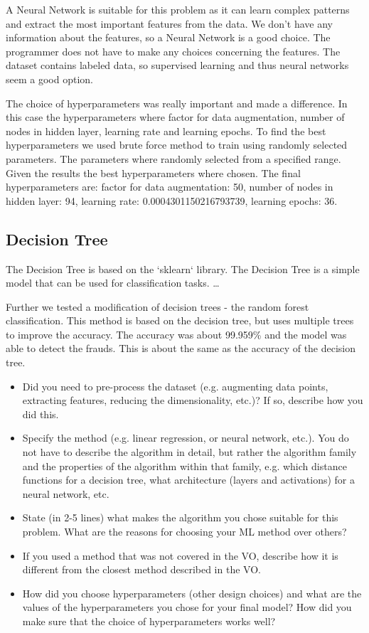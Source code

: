 \documentclass[a4paper, 10pt, conference]{ieeeconf}      %
\begin{document}
A Neural Network is suitable for this problem as it can learn complex patterns and extract the most important features from the data. 
We don't have any information about the features, so a Neural Network is a good choice. The programmer does not have to make any choices concerning the features. 
The dataset contains labeled data, so supervised learning and thus neural networks seem a good option.


The choice of hyperparameters was really important and made a difference. In this case the hyperparameters where factor for data augmentation, number of nodes in hidden layer, learning rate and learning epochs. 
To find the best hyperparameters we used brute force method to train using randomly selected parameters. The parameters where randomly selected from a specified range. 
Given the results the best hyperparameters where chosen. 
The final hyperparameters are: factor for data augmentation: 50, number of nodes in hidden layer: 94, learning rate: 0.0004301150216793739, learning epochs: 36.  %



\subsection{Decision Tree}
The Decision Tree is based on the `sklearn` library. The Decision Tree is a simple model that can be used for classification tasks. 
\dots

Further we tested a modification of decision trees - the random forest classification. This method is based on the decision tree, but uses multiple trees to improve the accuracy. 
The accuracy was about 99.959\% and the model was able to detect the frauds. This is about the same as the accuracy of the decision tree. 


{\color{blue}

\begin{itemize}
	\item Did you need to pre-process the dataset (e.g. augmenting data points, extracting features, reducing the dimensionality, etc.)? If so, describe how you did this.
	\item Specify the method (e.g. linear regression, or neural network, etc.). You do not have to describe the algorithm in detail, but rather the algorithm family and the properties of the algorithm within that family, e.g. which distance functions for a decision tree, what architecture (layers and activations) for a neural network, etc. 
	\item State (in 2-5 lines) what makes the algorithm you chose suitable for this problem. What are the reasons for choosing your ML method over others?
    \item If you used a method that was not covered in the VO, describe how it is different from the closest method described in the VO.
	\item How did you choose hyperparameters (other design choices) and what are the values of the hyperparameters you chose for your final model? How did you make sure that the choice of hyperparameters works well?
\end{itemize}
}
\end{document}
